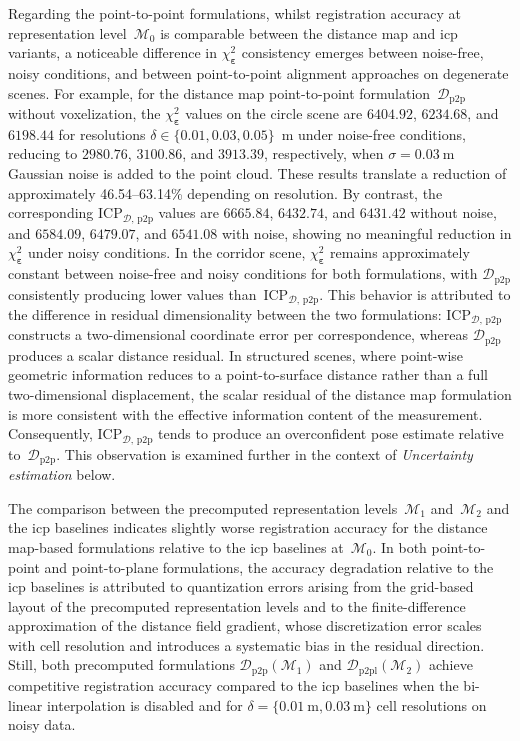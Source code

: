 Regarding the point-to-point formulations, whilst registration accuracy at
representation level~$\mathcal{M}_0$ is comparable between the distance map and
\gls{icp} variants, a noticeable difference in $\chi_{\boldsymbol{\varepsilon}}^2$ consistency emerges
between noise-free, noisy conditions, and between point-to-point alignment
approaches on degenerate scenes. For example, for the distance map
point-to-point formulation~$\mathcal{D}_\mathrm{p2p}$ without voxelization,
the $\chi_{\boldsymbol{\varepsilon}}^2$ values on the circle scene are
$6404.92$, $6234.68$, and $6198.44$ for resolutions
$\delta \in\{0.01, 0.03, 0.05\}$~m under noise-free conditions, reducing to
$2980.76$, $3100.86$, and $3913.39$, respectively, when
$\sigma = \SI{0.03}{\metre}$ Gaussian noise is added to the point cloud.
These results translate a reduction of approximately 46.54--63.14\% depending on
resolution. By contrast, the corresponding
$\mathrm{ICP}_{\mathcal{D},\,\mathrm{p2p}}$
values are $6665.84$, $6432.74$, and $6431.42$ without noise, and
$6584.09$, $6479.07$, and $6541.08$ with noise, showing no meaningful
reduction in $\chi_{\boldsymbol{\varepsilon}}^2$ under noisy conditions.
In the corridor scene, $\chi_{\boldsymbol{\varepsilon}}^2$ remains approximately constant between
noise-free and noisy conditions for both formulations, with
$\mathcal{D}_\mathrm{p2p}$ consistently producing lower values
than~$\mathrm{ICP}_{\mathcal{D},\,\mathrm{p2p}}$.
This behavior is attributed to the difference in residual dimensionality
between the two formulations: $\mathrm{ICP}_{\mathcal{D},\,\mathrm{p2p}}$
constructs a two-dimensional coordinate error per correspondence, whereas
$\mathcal{D}_\mathrm{p2p}$ produces a scalar distance residual.
In structured scenes, where point-wise geometric information reduces to a
point-to-surface distance rather than a full two-dimensional displacement,
the scalar residual of the distance map formulation is more consistent with
the effective information content of the measurement.
Consequently, $\mathrm{ICP}_{\mathcal{D},\,\mathrm{p2p}}$ tends to produce
an overconfident pose estimate relative to~$\mathcal{D}_\mathrm{p2p}$.
This observation is examined further in the context of
\emph{Uncertainty estimation} below.

The comparison between the precomputed representation
levels~$\mathcal{M}_1$ and~$\mathcal{M}_2$ and the \gls{icp} baselines
indicates slightly worse registration accuracy for the distance map-based
formulations relative to the \gls{icp} baselines at~$\mathcal{M}_0$.
In both point-to-point and point-to-plane formulations,
the accuracy degradation relative to the \gls{icp} baselines
is attributed to quantization errors arising from the grid-based layout of
the precomputed representation levels and to the finite-difference
approximation of the distance field gradient, whose discretization error
scales with cell resolution and introduces a systematic bias in the residual
direction. Still, both precomputed formulations
$\mathcal{D}_\mathrm{p2p}(\mathcal{M}_1)$ and
$\mathcal{D}_\mathrm{p2pl}(\mathcal{M}_2)$ achieve competitive registration
accuracy compared to the \gls{icp} baselines when the bi-linear interpolation
is disabled and for $\delta = \{\SI{0.01}{\metre}, \SI{0.03}{\metre}\}$
cell resolutions on noisy data.

